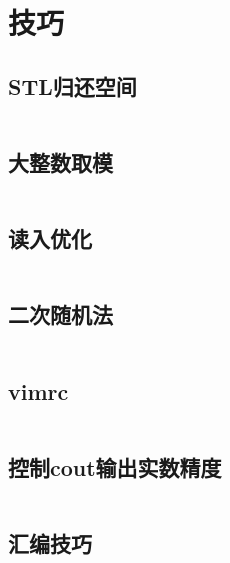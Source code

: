 \section{技巧}
\subsection{STL归还空间}
\inputminted{cpp}{\source/tricks/truly-release-container-space.cpp}
\subsection{大整数取模}
\inputminted{cpp}{\source/tricks/O1-multiply-mod.cpp}
\subsection{读入优化}
\inputminted{cpp}{\source/tricks/unbeatable-input-acceleration.cpp}
\subsection{二次随机法}
\inputminted{cpp}{\source/tricks/mersenne-twister.cpp}
\subsection{vimrc}
\inputminted{cpp}{\source/tricks/vimrc}
\subsection{控制cout输出实数精度}
\inputminted{cpp}{\source/tricks/control-cout-precision.cpp}
\subsection{汇编技巧}
\inputminted{cpp}{\source/tricks/tech.cpp}
